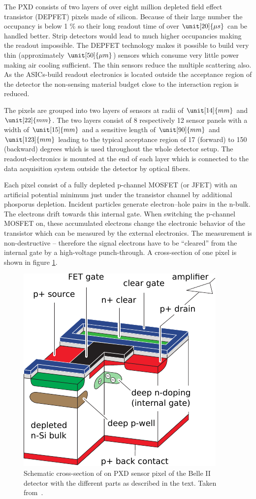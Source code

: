 The PXD consists of two layers of over eight million depleted field effect transistor (DEPFET) pixels made of silicon. Because of their large number the occupancy is below 1 \% so their long readout time of over $\unit[20]{\mu s}$ can be handled better. Strip detectors would lead to much higher occupancies making the readout impossible.
The DEPFET technology makes it possible to build very thin (approximately $\unit[50]{\mu m}$) sensors which consume very little power making air cooling sufficient. The thin sensors reduce the multiple scattering also. As the ASICs-build readout electronics is located outside the acceptance region of the detector the non-sensing material budget close to the interaction region is reduced.

The pixels are grouped into two layers of sensors at radii of $\unit[14]{mm}$ and $\unit[22]{mm}$. The two layers consist of 8 respectively 12 sensor panels with a width of $\unit[15]{mm}$ and a sensitive length of $\unit[90]{mm}$ and $\unit[123]{mm}$ leading to the typical acceptance region of 17 (forward) to 150 (backward) degrees which is used throughout the whole detector setup. The readout-electronics is mounted at the end of each layer which is connected to the data acquisition system outside the detector by optical fibers.

Each pixel consist of a fully depleted p-channel MOSFET (or JFET) with an artificial potential minimum just under the transistor channel by additional phosporus depletion. Incident particles generate electron--hole pairs in the n-bulk. The electrons drift towards this internal gate. When switching the p-channel MOSFET on, these accumulated electrons change the electronic behavior of the transistor which can be measured by the external electronics. The measurement is non-destructive -- therefore the signal electrons have to be ``cleared'' from the internal gate by a high-voltage punch-through. A cross-section of one pixel is shown in figure \ref{fig-pxd-schema}.

\begin{figure}
  \centering
  \includegraphics[width=0.6\linewidth]{figures/experimental_setup/pxd.pdf}
  \caption[Cross-section of a PXD sensor]{Schematic cross-section of on PXD sensor pixel of the Belle II detector with the different parts as described in the text. Taken from~\cite{tdr}.}
  \label{fig-pxd-schema}
\end{figure}


